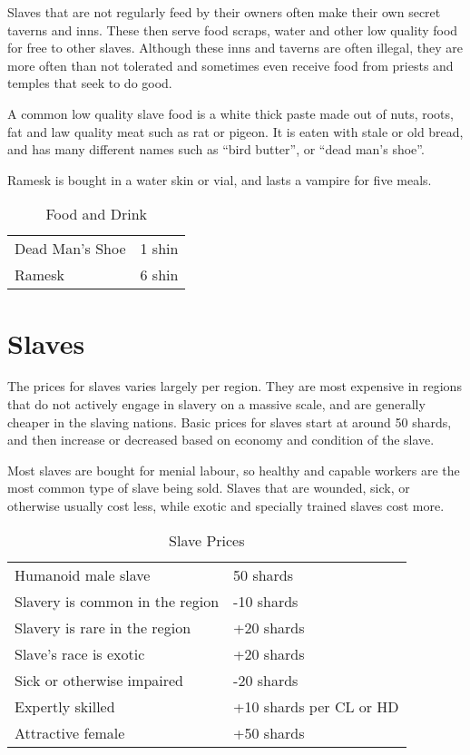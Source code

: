 Slaves that are not regularly feed by their owners often make their own
secret taverns and inns. These then serve food scraps, water and other low
quality food for free to other slaves. Although these inns and taverns are
often illegal, they are more often than not tolerated and sometimes even
receive food from priests and temples that seek to do good.

A common low quality slave food is a white thick paste made out of nuts,
roots, fat and law quality meat such as rat or pigeon. It is eaten with
stale or old bread, and has many different names such as ``bird butter'',
or ``dead man's shoe''.

Ramesk is bought in a water skin or vial, and lasts a vampire for five meals.

\begin{table*}
  \caption{Food and Drink} \label{tbl:Food and Drink}
  \begin{tabular}{p{10cm} l}
    Dead Man's Shoe             &  1 shin \\
    Ramesk                      &  6 shin \\
  \end{tabular}
\end{table*}

\section{Slaves}
\label{sec:Slave Prices}

The prices for slaves varies largely per region. They are most expensive in
regions that do not actively engage in slavery on a massive scale, and are
generally cheaper in the slaving nations. Basic prices for slaves start at
around 50 shards, and then increase or decreased based on economy and
condition of the slave.

Most slaves are bought for menial labour, so healthy and capable workers are
the most common type of slave being sold. Slaves that are wounded, sick, or
otherwise usually cost less, while exotic and specially trained slaves cost
more.

\begin{table*}
  \caption{Slave Prices} \label{tbl:Slave Prices}
  \begin{tabular}{p{10cm} l}
    Humanoid male slave             &  50 shards \\
    Slavery is common in the region & -10 shards \\
    Slavery is rare in the region   & +20 shards \\
    Slave's race is exotic          & +20 shards \\
    Sick or otherwise impaired      & -20 shards \\
    Expertly skilled                & +10 shards per CL or HD \\
    Attractive female               & +50 shards
  \end{tabular}
\end{table*}

